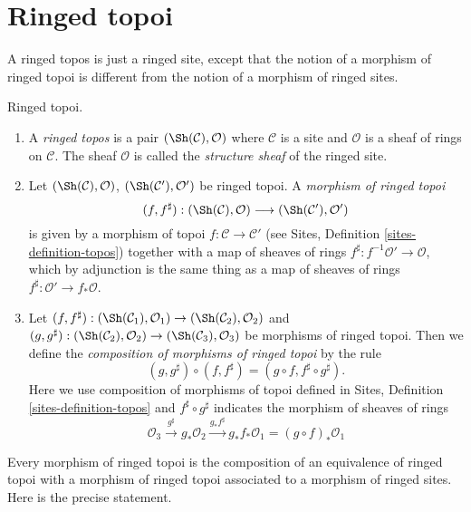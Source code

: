 \section{Ringed topoi}
\label{section-ringed-topoi}

\noindent
A ringed topos is just a ringed site, except that the notion of
a morphism of ringed topoi is different from the notion of a morphism
of ringed sites.

\begin{definition}
\label{definition-ringed-topos}
Ringed topoi.
\begin{enumerate}
\item A {\it ringed topos} is a pair
$(\Sh(\mathcal{C}), \mathcal{O})$
where $\mathcal{C}$ is a site and $\mathcal{O}$ is a sheaf of rings
on $\mathcal{C}$. The sheaf $\mathcal{O}$ is called the
{\it structure sheaf} of the ringed site.
\item Let $(\Sh(\mathcal{C}), \mathcal{O})$,
$(\Sh(\mathcal{C}'), \mathcal{O}')$ be ringed topoi.
A {\it morphism of ringed topoi}
$$
(f, f^\sharp) :
(\Sh(\mathcal{C}), \mathcal{O})
\longrightarrow
(\Sh(\mathcal{C}'), \mathcal{O}')
$$
is given by a morphism of topoi $f : \mathcal{C} \to \mathcal{C}'$
(see Sites, Definition \ref{sites-definition-topos})
together with a map of sheaves of rings
$f^\sharp : f^{-1}\mathcal{O}' \to \mathcal{O}$, which by adjunction
is the same thing as a map of sheaves of rings
$f^\sharp : \mathcal{O}' \to f_*\mathcal{O}$.
\item Let
$(f, f^\sharp) :
(\Sh(\mathcal{C}_1), \mathcal{O}_1)
\to (\Sh(\mathcal{C}_2), \mathcal{O}_2)$ and
$(g, g^\sharp) :
(\Sh(\mathcal{C}_2), \mathcal{O}_2) \to
(\Sh(\mathcal{C}_3), \mathcal{O}_3)$
be morphisms of ringed topoi. Then we define
the {\it composition of morphisms of ringed topoi}
by the rule
$$
(g, g^\sharp) \circ (f, f^\sharp) = (g \circ f, f^\sharp \circ g^\sharp).
$$
Here we use composition of morphisms of topoi defined in
Sites, Definition \ref{sites-definition-topos}
and $f^\sharp \circ g^\sharp$ indicates the morphism of sheaves of
rings
$$
\mathcal{O}_3 \xrightarrow{g^\sharp} g_*\mathcal{O}_2
\xrightarrow{g_*f^\sharp} g_*f_*\mathcal{O}_1 = (g \circ f)_*\mathcal{O}_1
$$
\end{enumerate}
\end{definition}

\noindent
Every morphism of ringed topoi is the composition of an equivalence
of ringed topoi with a morphism of ringed topoi associated to a morphism
of ringed sites. Here is the precise statement.

